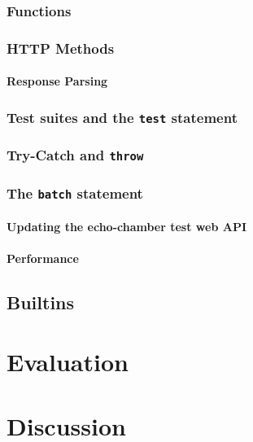 \documentclass[]{full}
\theoremstyle{definition}
\begin{document}
\subsection{Functions}

\subsection{HTTP Methods}

\subsubsection{Response Parsing}

\cprotect\subsection{Test suites and the \verb|test| statement}

\cprotect\subsection{Try-Catch and \verb|throw|}

\cprotect\subsection{The \verb|batch| statement}
\label{sec:eval-ast-nodes-batch}

\subsubsection{Updating the echo-chamber test web API}

\subsubsection{Performance}

\section{Builtins}

\chapter{Evaluation}
\label{chap:evaluation}

\chapter{Discussion}
\label{chap:discussion}
\end{document}
